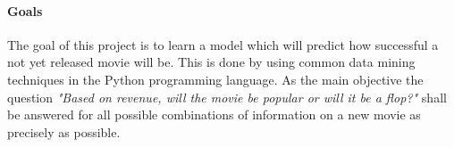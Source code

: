 \paragraph{Goals}
The goal of this project is to learn a model which will predict how successful a not yet released movie will be. This is done by using common data mining techniques in the Python programming language.  As the main objective the question \textit{"Based on revenue, will the movie be popular or will it be a flop?"} shall be answered for all possible combinations of information on a new movie as precisely as possible.








 